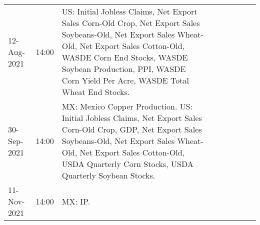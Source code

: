 \documentclass[a4paper,10pt]{article}
\begin{document}
\begin{tiny}
\begin{center}
\begin{longtable}{p{1.8cm}p{1cm}p{11.7cm}p{1.8cm}p{1cm}p{11.7cm}p{1.8cm}p{1cm}p{11.7cm}}
12-Aug-2021 & 14:00 & US: Initial Jobless Claims, Net Export Sales Corn-Old Crop, Net Export Sales Soybeans-Old, Net Export Sales Wheat-Old, Net Export Sales Cotton-Old, WASDE Corn End Stocks, WASDE Soybean Production, PPI, WASDE Corn Yield Per Acre, WASDE Total Wheat End Stocks. \\
30-Sep-2021 & 14:00 & MX: Mexico Copper Production. US: Initial Jobless Claims, Net Export Sales Corn-Old Crop, GDP, Net Export Sales Soybeans-Old, Net Export Sales Wheat-Old, Net Export Sales Cotton-Old, USDA Quarterly Corn Stocks, USDA Quarterly Soybean Stocks. \\
11-Nov-2021 & 14:00 & MX: IP. \\
\bottomrule
\end{longtable}
\end{center}
\end{tiny}
\end{document}
